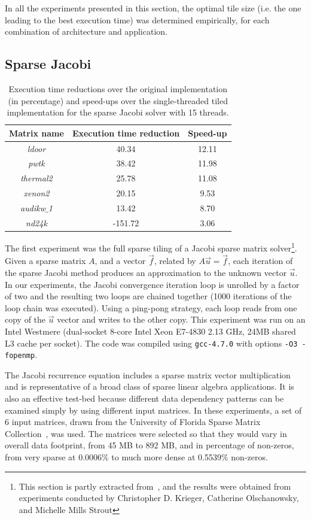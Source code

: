 In all the experiments presented in this section, the optimal tile size (i.e. the one leading to the best execution time) was determined empirically, for each combination of architecture and application. 

\subsection{Sparse Jacobi}

\begin{table}[t]
\centering
\begin{tabulary}{1.0\columnwidth}{c | c | c}
\hline
Matrix name & Execution time reduction & Speed-up  \\
\hline \hline
{\em ldoor} & 40.34 & 12.11 \\
{\em pwtk} & 38.42 & 11.98 \\
{\em thermal2} & 25.78 & 11.08 \\
{\em xenon2} & 20.15 & 9.53 \\
{\em audikw$\_$1} & 13.42 & 8.70 \\
{\em nd24k} & -151.72 & 3.06 \\
\hline
\end{tabulary}
\caption{Execution time reductions over the original implementation (in percentage) and speed-ups over the single-threaded tiled implementation for the sparse Jacobi solver with 15 threads.}
\label{table:st-jacobi}
\end{table}

The first experiment was the full sparse tiling of a Jacobi sparse matrix solver\footnote{This section is partly extracted from~\cite{st-paper}, and the results were obtained from experiments conducted by Christopher D. Krieger, Catherine Olschanowsky, and Michelle Mills Strout}. Given a sparse matrix $A$, and a vector $\vec{f}$, related by $A\vec{u}=\vec{f}$, each iteration of the sparse Jacobi method produces an approximation to the unknown vector $\vec{u}$. In our experiments, the Jacobi convergence iteration loop is unrolled by a factor of two and the resulting two loops are chained together (1000 iterations of the loop chain was executed). Using a ping-pong strategy, each loop reads from one copy of the $\vec{u}$ vector and writes to the other copy. This experiment was run on an Intel Westmere (dual-socket 8-core Intel Xeon E7-4830 2.13 GHz, 24MB shared L3 cache per socket). The code was compiled using {\tt gcc-4.7.0} with options {\tt -O3 -fopenmp}.

The Jacobi recurrence equation includes a sparse matrix vector multiplication and is representative of a broad class of sparse linear algebra applications. It is also an effective test-bed because different data dependency patterns can be examined simply by using different input matrices. In these experiments, a set of 6 input matrices, drawn from the University of Florida Sparse Matrix Collection~\citep{ST-MatrixMarket}, was used. The matrices were selected so that they would vary in overall data footprint, from 45 MB to 892 MB, and in percentage of non-zeros, from very sparse at 0.0006\% to much more dense at 0.5539\% non-zeros. %

